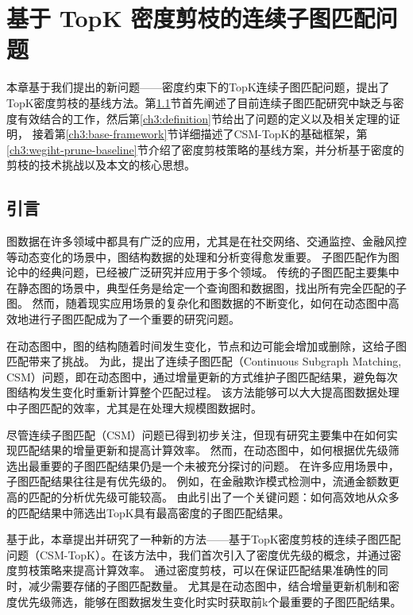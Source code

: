 \chapter{基于 TopK 密度剪枝的连续子图匹配问题}
\label{ch3}
本章基于我们提出的新问题——密度约束下的TopK连续子图匹配问题，提出了TopK密度剪枝的基线方法。第\ref{ch3:introduction}节首先阐述了目前连续子图匹配研究中缺乏与密度有效结合的工作，然后第\ref{ch3:definition}节给出了问题的定义以及相关定理的证明，
接着第\ref{ch3:base-framework}节详细描述了CSM-TopK的基础框架，第\ref{ch3:wegiht-prune-baseline}节介绍了密度剪枝策略的基线方案，并分析基于密度的剪枝的技术挑战以及本文的核心思想。
\section{引言}
\label{ch3:introduction}
图数据在许多领域中都具有广泛的应用，尤其是在社交网络、交通监控、金融风控等动态变化的场景中，图结构数据的处理和分析变得愈发重要。
子图匹配作为图论中的经典问题，已经被广泛研究并应用于多个领域。
传统的子图匹配主要集中在静态图的场景中，典型任务是给定一个查询图和数据图，找出所有完全匹配的子图。
然而，随着现实应用场景的复杂化和图数据的不断变化，如何在动态图中高效地进行子图匹配成为了一个重要的研究问题。

在动态图中，图的结构随着时间发生变化，节点和边可能会增加或删除，这给子图匹配带来了挑战。
为此，提出了连续子图匹配（Continuous Subgraph Matching, CSM）问题，即在动态图中，通过增量更新的方式维护子图匹配结果，避免每次图结构发生变化时重新计算整个匹配过程。
该方法能够可以大大提高图数据处理中子图匹配的效率，尤其是在处理大规模图数据时。

尽管连续子图匹配（CSM）问题已得到初步关注，但现有研究主要集中在如何实现匹配结果的增量更新和提高计算效率。
然而，在动态图中，如何根据优先级筛选出最重要的子图匹配结果仍是一个未被充分探讨的问题。
在许多应用场景中，子图匹配结果往往是有优先级的。
例如，在金融欺诈模式检测中，流通金额数更高的匹配的分析优先级可能较高。
由此引出了一个关键问题：如何高效地从众多的匹配结果中筛选出TopK具有最高密度的子图匹配结果。

基于此，本章提出并研究了一种新的方法——基于TopK密度剪枝的连续子图匹配问题（CSM-TopK）。在该方法中，我们首次引入了密度优先级的概念，并通过密度剪枝策略来提高计算效率。
通过密度剪枝，可以在保证匹配结果准确性的同时，减少需要存储的子图匹配数量。
尤其是在动态图中，结合增量更新机制和密度优先级筛选，能够在图数据发生变化时实时获取前k个最重要的子图匹配结果。
